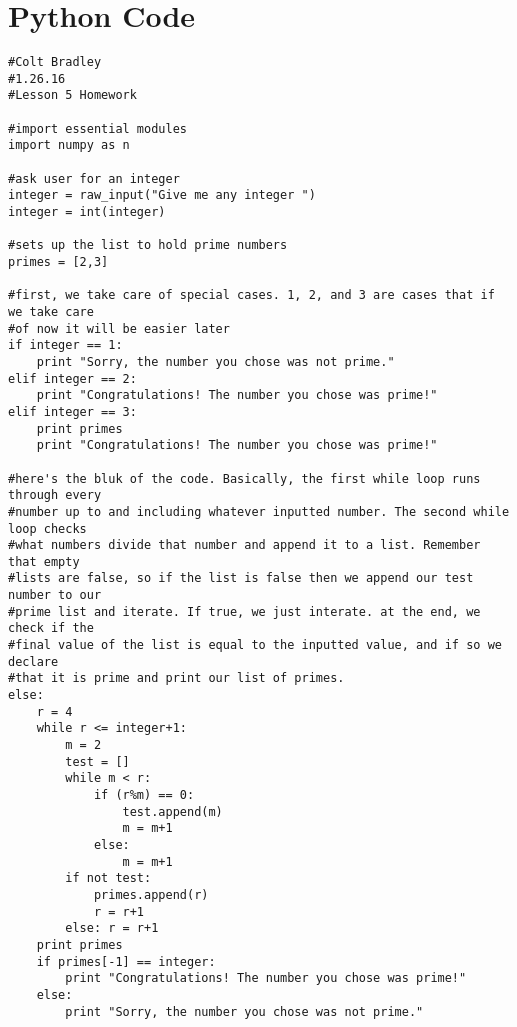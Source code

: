 \documentclass[11pt]{article}
\begin{document}
\section{Python Code}
\begin{verbatim}
#Colt Bradley
#1.26.16
#Lesson 5 Homework

#import essential modules 
import numpy as n

#ask user for an integer
integer = raw_input("Give me any integer ")
integer = int(integer)

#sets up the list to hold prime numbers
primes = [2,3]

#first, we take care of special cases. 1, 2, and 3 are cases that if we take care 
#of now it will be easier later            
if integer == 1:
    print "Sorry, the number you chose was not prime."
elif integer == 2:
    print "Congratulations! The number you chose was prime!"
elif integer == 3:
    print primes
    print "Congratulations! The number you chose was prime!"

#here's the bluk of the code. Basically, the first while loop runs through every  
#number up to and including whatever inputted number. The second while loop checks 
#what numbers divide that number and append it to a list. Remember that empty  
#lists are false, so if the list is false then we append our test number to our  
#prime list and iterate. If true, we just interate. at the end, we check if the 
#final value of the list is equal to the inputted value, and if so we declare 
#that it is prime and print our list of primes. 
else:
    r = 4
    while r <= integer+1:
        m = 2
        test = []
        while m < r:
            if (r%m) == 0:
                test.append(m)
                m = m+1
            else:
                m = m+1
        if not test:
            primes.append(r)
            r = r+1
        else: r = r+1
    print primes
    if primes[-1] == integer:
        print "Congratulations! The number you chose was prime!"
    else:
        print "Sorry, the number you chose was not prime."
\end{verbatim}
\end{document}
